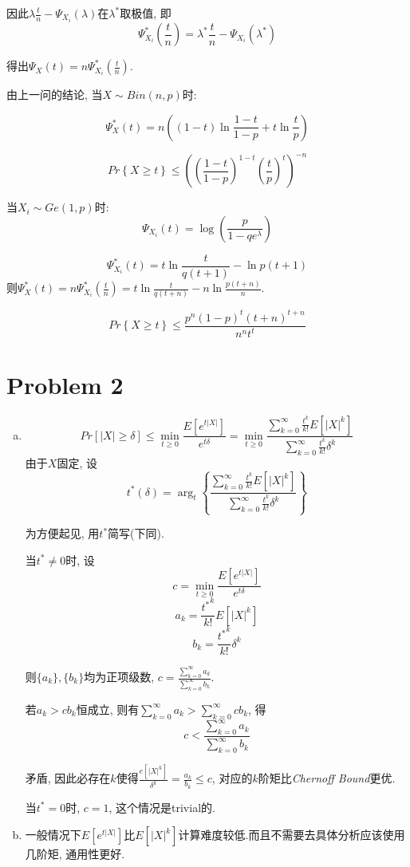 \documentclass[paper=a4, fontsize=11pt]{scrartcl} %
\numberwithin{equation}{section} %
\numberwithin{figure}{section} %
\numberwithin{table}{section} %
\begin{document}
\begin{enumerate}[(a)]
    因此$\lambda\frac{t}{n} - \Psi_{X_i}(\lambda)$在$\lambda^*$取极值, 即
    $$\Psi_{X_i}^*\left(\frac{t}{n}\right) = \lambda^*\frac{t}{n} - \Psi_{X_i}(\lambda^*)$$
    
    得出$\Psi_{X}(t) = n\Psi_{X_i}^*\left(\frac{t}{n}\right)$.
    
    由上一问的结论, 当$X\sim \mathit{Bin}(n,p)$时:
    
    $$\Psi_{X}^*(t) = n\left((1-t)\ln\frac{1-t}{1-p} + t\ln \frac{t}{p}\right) $$
    
    $$Pr\left\{X\geq t\right\} \leq \left(\left(\frac{1-t}{1-p}\right)^{1-t}\left(\frac{t}{p}\right)^{t}\right)^{-n} $$
    
    当$X_i \sim \mathit{Ge}(1, p)$时:
    $$\Psi_{X_i}(t)=\log\left(\frac{p}{1-qe^{\lambda}}\right)$$
    
    $$\Psi_{X_i}^*(t)=t\ln\frac{t}{q(t+1)} - \ln p(t+1) $$
    则$\Psi_{X}^*(t) = n\Psi_{X_i}^*(\frac{t}{n}) = t\ln\frac{t}{q(t+n)} - n\ln\frac{p(t+n)}{n}$.
    
    $$Pr\left\{X\geq t\right\}\leq \frac{p^n(1-p)^t(t+n)^{t+n}}{n^nt^t} $$
\end{enumerate}
\section*{Problem 2}
\begin{enumerate}[(a)]
	\item
	$$ Pr[|X|\geq \delta] \leq \min_{t\geq 0} \frac{E[e^{t|X|}]}{e^{t \delta}} = \min_{t\geq 0} \frac{\sum\limits_{k=0}^{\infty}\frac{t^k}{k!}E[|X|^k]}{\sum\limits_{k=0}^{\infty}\frac{t^k}{k!}\delta^k} $$
	由于$X$固定, 设$$t^*(\delta)=\arg_{t}\left\{\frac{\sum\limits_{k=0}^{\infty}\frac{t^k}{k!}E[|X|^k]}{\sum\limits_{k=0}^{\infty}\frac{t^k}{k!}\delta^k}\right\}$$
    
    为方便起见, 用$t^*$简写(下同).

	当$t^*\not=0$时, 设$$c = \min\limits_{t\geq 0}\frac{E[e^{t|X|}]}{e^{t\delta}}$$ $$a_k = \frac{{t^*}^k}{k!}E[|X|^k]$$ $$b_k=\frac{{t^*}^k}{k!}\delta^k$$
    
    则$\{a_k\},\{b_k\}$均为正项级数, $c = \frac{\sum\limits_{k=0}^{\infty}a_k}{\sum\limits_{k=0}^{\infty}b_k}$.
    
    若$a_k > cb_k$恒成立, 则有$\sum_{k=0}^{\infty}a_k > \sum_{k=0}^{\infty}cb_k$, 得
    $$c < \frac{\sum\limits_{k=0}^{\infty}a_k}{\sum\limits_{k=0}^{\infty}b_k}$$
    
    矛盾, 因此必存在$k$使得$\frac{e[|X|^k]}{\delta^k} = \frac{a_k}{b_k}\leq c$, 对应的$k$阶矩比\textit{Chernoff Bound}更优.
    
    当$t^*=0$时, $c=1$, 这个情况是trivial的.
    \item
    一般情况下$E[e^{t|X|}]$比$E[|X|^k]$计算难度较低.而且不需要去具体分析应该使用几阶矩, 通用性更好.
\end{enumerate}
\end{document}
